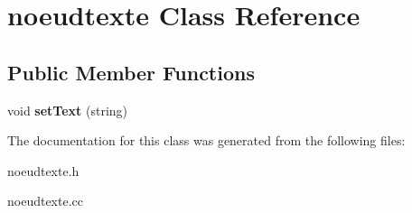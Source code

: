 \hypertarget{classnoeudtexte}{\section{noeudtexte Class Reference}
\label{classnoeudtexte}
}
\subsection*{Public Member Functions}
\begin{DoxyCompactItemize}
\item 
\hypertarget{classnoeudtexte_a0418b6a301c85c8c0a0f2b7fb293ba47}{void {\bfseries set\-Text} (string)}\label{classnoeudtexte_a0418b6a301c85c8c0a0f2b7fb293ba47}

\end{DoxyCompactItemize}


The documentation for this class was generated from the following files\-:\begin{DoxyCompactItemize}
\item 
noeudtexte.\-h\item 
noeudtexte.\-cc\end{DoxyCompactItemize}
